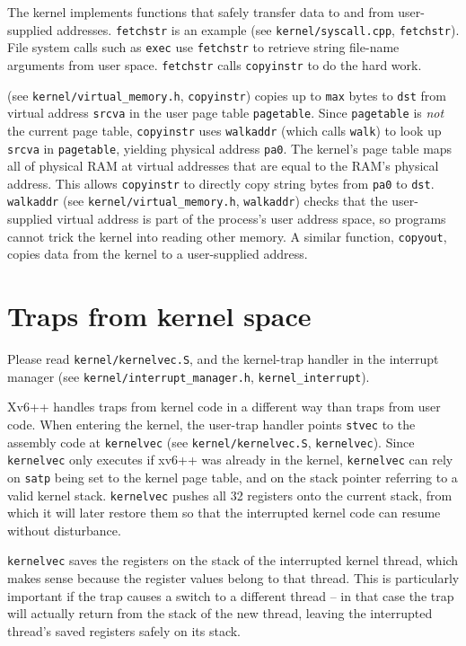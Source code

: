 The kernel implements functions that safely transfer data to and
from user-supplied addresses.
{\tt fetchstr} is an example (see \texttt{kernel/syscall.cpp}, \texttt{fetchstr}).
File system calls such as
{\tt exec} use {\tt fetchstr} to retrieve string file-name arguments from user
space.
\lstinline{fetchstr} calls \lstinline{copyinstr}
to do the hard work.

(see \texttt{kernel/virtual\_memory.h}, \texttt{copyinstr}) copies up to \lstinline{max} bytes to
\lstinline{dst} from virtual address \lstinline{srcva} in the user page
table \lstinline{pagetable}.
Since \lstinline{pagetable} is {\it not} the current page
table,
\lstinline{copyinstr} uses {\tt walkaddr}
(which calls {\tt walk}) to look up
\lstinline{srcva} in
\lstinline{pagetable}, yielding
physical address \lstinline{pa0}.
The kernel's page table maps all of physical RAM
at virtual addresses that are equal to the RAM's physical address.
This allows
{\tt copyinstr} to directly copy string bytes from {\tt pa0} to {\tt dst}.
{\tt walkaddr}
(see \texttt{kernel/virtual\_memory.h}, \texttt{walkaddr})
checks that the user-supplied virtual address is part of
the process's user address space, so programs
cannot trick the kernel into reading other memory.
A similar function, {\tt copyout}, copies data from the
kernel to a user-supplied address.

\section{Traps from kernel space}
\label{s:ktraps}

Please read {\tt kernel/kernelvec.S},
and the kernel-trap handler in the interrupt manager
(see \texttt{kernel/interrupt\_manager.h}, \texttt{kernel\_interrupt}).

Xv6++ handles traps from kernel code in a different way
than traps from user code.
When entering the kernel, the user-trap handler points {\tt stvec}
to the assembly code at {\tt kernelvec}
(see \texttt{kernel/kernelvec.S}, \texttt{kernelvec}).
Since {\tt kernelvec} only executes if
xv6++ was already in the kernel, {\tt kernelvec} can rely
on {\tt satp} being set to the kernel page table, and on the
stack pointer referring to a valid kernel stack.
{\tt kernelvec} pushes all 32 registers onto the current stack,
from which it will later restore them
so that the interrupted
kernel code can resume without disturbance.

{\tt kernelvec} saves the registers on the stack of the interrupted
kernel thread, which makes sense because the register values belong to
that thread. This is particularly important if the trap causes a
switch to a different thread -- in that case the trap will actually
return from the stack of the new thread, leaving the interrupted
thread's saved registers safely on its stack.

